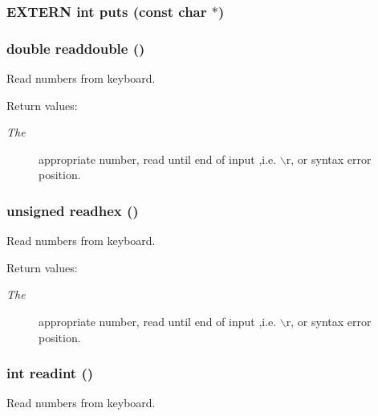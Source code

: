 \subsubsection{\setlength{\rightskip}{0pt plus 5cm}EXTERN int puts (const char $\ast$)}\label{hpstdio_8h_a18}


\subsubsection{\setlength{\rightskip}{0pt plus 5cm}double readdouble ()}\label{hpstdio_8h_a17}


Read numbers from keyboard.

\begin{Desc}
\item[Return values: ]\par
\begin{description}
\item[{\em 
The}]appropriate number, read until end of input ,i.e. $\backslash$r, or syntax error position. \end{description}
\end{Desc}
\subsubsection{\setlength{\rightskip}{0pt plus 5cm}unsigned readhex ()}\label{hpstdio_8h_a14}


Read numbers from keyboard.

\begin{Desc}
\item[Return values: ]\par
\begin{description}
\item[{\em 
The}]appropriate number, read until end of input ,i.e. $\backslash$r, or syntax error position. \end{description}
\end{Desc}
\subsubsection{\setlength{\rightskip}{0pt plus 5cm}int readint ()}\label{hpstdio_8h_a12}


Read numbers from keyboard.

